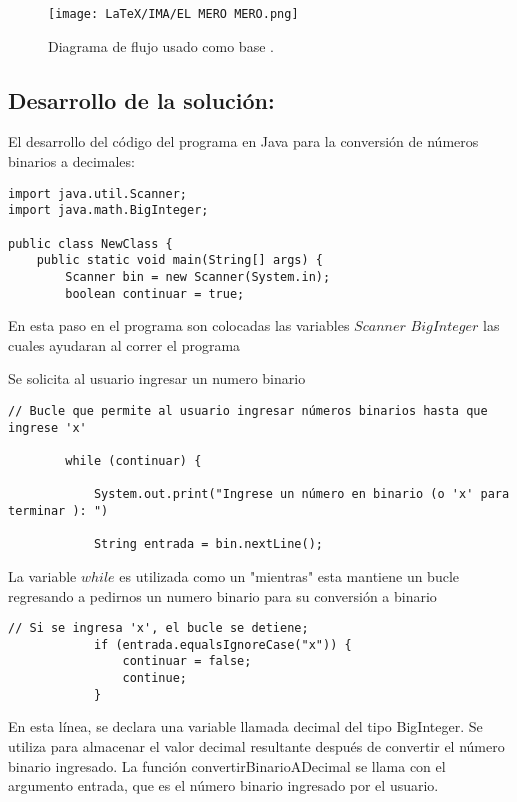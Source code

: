 \begin{figure}[H]
    \centering
    \texttt{[image: LaTeX/IMA/EL MERO MERO.png]}
    \caption{Diagrama de flujo usado como base .}
\end{figure}


\subsection{\textbf{Desarrollo de la solución:}}
El desarrollo del código del programa en Java para la conversión de números binarios a decimales:

\begin{lstlisting}[style=javaStyle]
import java.util.Scanner;
import java.math.BigInteger;

public class NewClass {
    public static void main(String[] args) {
        Scanner bin = new Scanner(System.in);
        boolean continuar = true;
\end{lstlisting}
En esta paso en el programa son colocadas las variables $Scanner$ $BigInteger$
las cuales ayudaran al correr el programa

Se solicita al usuario ingresar un numero binario
\begin{lstlisting}[style=javaStyle]
// Bucle que permite al usuario ingresar números binarios hasta que ingrese 'x'

        while (continuar) {
        
            System.out.print("Ingrese un número en binario (o 'x' para terminar ): ")
            
            String entrada = bin.nextLine();
\end{lstlisting}

 La variable $while$ es utilizada como un "mientras" esta mantiene un bucle regresando a pedirnos un numero binario para su conversión a binario

\begin{lstlisting}[style=javaStyle]
                 // Si se ingresa 'x', el bucle se detiene;
            if (entrada.equalsIgnoreCase("x")) {
                continuar = false;
                continue;
            }
\end{lstlisting}

En esta línea, se declara una variable llamada decimal del tipo BigInteger. Se utiliza para almacenar el valor decimal resultante después de convertir el número binario ingresado. La función convertirBinarioADecimal se llama con el argumento entrada, que es el número binario ingresado por el usuario.

